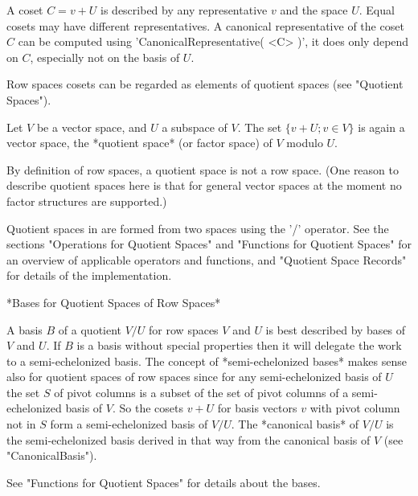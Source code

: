 A coset $C = v + U$ is described by any representative $v$ and the space $U$.
Equal cosets may have different representatives.  A canonical representative
of the coset $C$ can be computed using 'CanonicalRepresentative( <C> )', it
does only depend on $C$, especially not on the basis of $U$.

Row spaces cosets can be regarded as elements of quotient spaces
(see "Quotient Spaces").


Let $V$ be a vector space, and $U$ a subspace of $V$.
The set $\{ v + U; v \in V \}$ is again a vector space, the *quotient space*
(or factor space) of $V$ modulo $U$.

By definition of row spaces, a quotient space is not a row space.
(One reason to describe quotient spaces here is that for general vector
spaces at the moment no factor structures are supported.)

Quotient spaces in {\GAP} are formed from two spaces using the '/'
operator.  See the sections "Operations for Quotient Spaces" and
"Functions for Quotient Spaces" for an overview of applicable operators
and functions, and "Quotient Space Records" for details of the
implementation.


\vspace{5mm}

*Bases for Quotient Spaces of Row Spaces*

A basis $B$ of a quotient $V / U$ for row spaces $V$ and $U$ is best
described by bases of $V$ and $U$.
If $B$ is a basis without special properties then it will delegate the work
to a semi-echelonized basis.
The concept of *semi-echelonized bases* makes sense also for quotient spaces
of row spaces since for any semi-echelonized basis of $U$ the set $S$ of
pivot columns is a subset of the set of pivot columns of a semi-echelonized
basis of $V$.
So the cosets $v + U$ for basis vectors $v$ with pivot column not in $S$
form a semi-echelonized basis of $V / U$.
The *canonical basis* of $V / U$ is the semi-echelonized basis derived in
that way from the canonical basis of $V$ (see "CanonicalBasis").

See "Functions for Quotient Spaces" for details about the bases.

